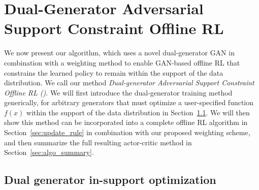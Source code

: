 \section{Dual-Generator Adversarial Support Constraint Offline RL}

We now present our algorithm, which uses a novel dual-generator GAN in combination with a weighting method to enable GAN-based offline RL that constrains the learned policy to remain within the support of the data distribution. We call our method \textit{Dual-generator Adversarial Support Constraint Offline RL (\name{})}. We will first introduce the dual-generator training method generically, for arbitrary generators that must optimize a user-specified function $f(x)$ within the support of the data distribution in Section~\ref{sec:dual_gen}. We will then show this method can be incorporated into a complete offline RL algorithm in Section~\ref{sec:update_rule} in combination with our proposed weighting scheme, and then summarize the full resulting actor-critic method in Section~\ref{sec:algo_summary}.

\subsection{Dual generator in-support optimization}
\label{sec:dual_gen}

